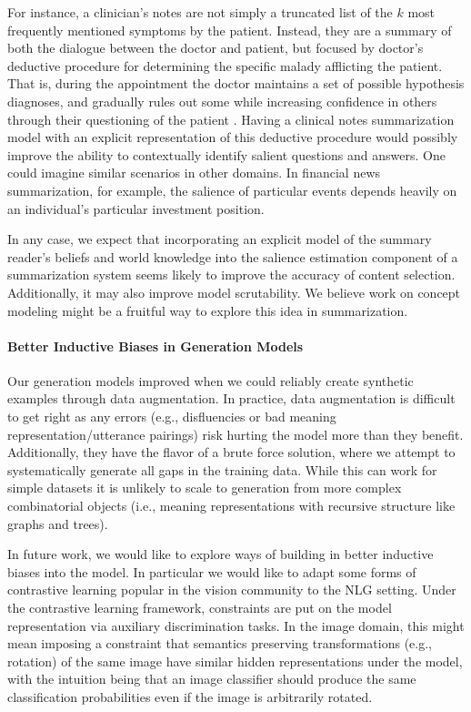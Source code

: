 For instance, a clinician's notes are not simply a truncated list of the 
$k$ most frequently mentioned symptoms by the patient. Instead, they are 
a summary of both the dialogue between the doctor and patient, but focused
by doctor's deductive procedure for determining the specific malady afflicting
the patient. That is, during the appointment the doctor maintains a set 
of possible hypothesis diagnoses, and gradually rules out some while increasing confidence in others through their questioning of the patient \citep{pivovarov2015}. 
Having a clinical notes summarization model with an explicit representation 
of this deductive procedure would possibly improve the ability to contextually identify salient questions and answers.
One could imagine similar scenarios in other domains. In financial news 
summarization, for example, the salience of particular events depends heavily on an individual's particular investment position. 


In any case,  we expect that incorporating an explicit model of the summary reader's beliefs
and world knowledge into the salience estimation component of a summarization
system seems likely to improve the accuracy of content selection. Additionally,
it may also improve model scrutability. We believe work on concept modeling 
\citep{bosselut2019} might be a fruitful way to explore this idea in summarization.


\paragraph{Better Inductive Biases in Generation Models}
Our generation models improved when we could reliably create synthetic examples
through data augmentation. In practice, data augmentation is difficult to get
right as any errors (e.g., disfluencies or bad meaning representation/utterance
pairings) risk hurting the model more than they benefit. Additionally, they
have the flavor of a brute force solution, where we attempt to systematically
generate all gaps in the training data. While this can work for simple datasets
it is unlikely to scale to generation from more complex combinatorial objects (i.e., meaning representations with recursive structure like graphs and trees).

In future work, we would like to explore ways of building in better inductive
biases into the model. In particular we would like to adapt some forms of
contrastive learning popular in the vision community \citep{chen2020} to the
NLG setting. Under the contrastive learning framework,  constraints
are put on the model representation via auxiliary discrimination tasks. In
the image domain, this might mean imposing a constraint that semantics preserving transformations (e.g., rotation)
of the same image have similar hidden representations under the model, with
the intuition being that an image classifier should produce the same 
classification probabilities even if the image is arbitrarily rotated.


